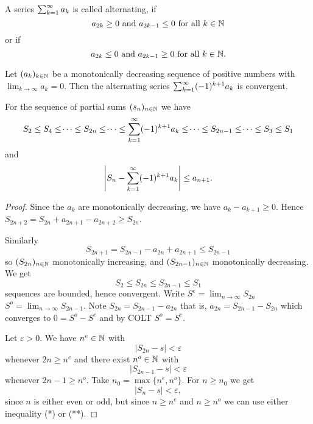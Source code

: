 \documentclass[10pt, a4paper]{article}
\newcommand{\dseq}[2][n]{(#2_#1)_{#1 \in \N}}
\begin{document}
\begin{definition}
    A series $\sum_{k = 1}^{\infty} a_k$ is called alternating,
    if
    \[
    a_{2k} \geq 0\text{ and } a_{2k - 1} \leq 0\text{ for all $k \in \mathbb{N}$}
    \]
    or if 
    \[
    a_{2k} \leq 0\text{ and } a_{2k - 1} \geq 0\text{ for all $k \in \mathbb{N}$}.
    \]
\end{definition}

\begin{theorem}
    Let $\dseq[k]{a}$ be a monotonically decreasing sequence of positive numbers with $\lim_{k \rightarrow \infty}a_k = 0$.
    Then the alternating series $\sum_{k = 1}^{\infty}(-1) ^ {k + 1}a_k$ is convergent.

    For the sequence of partial sums $\dseq{s}$ we have
    \[
    S_2 \leq S_4 \leq \dotsi \leq S_{2n} \leq \dotsi \leq \sum_{k = 1}^{\infty}(-1) ^ {k + 1}a_k \leq \dotsi \leq S_{2n - 1} \leq \dotsi \leq S_3 \leq S_1
    \]
    and
    \[
    \left|S_n - \sum_{k = 1}^{\infty}(-1) ^ {k + 1}a_k\right| \leq a_{n + 1}.
    \]
    \begin{proof}
        Since the $a_k$ are monotonically decreasing,
        we have $a_k - a_{k + 1} \geq 0$.
        Hence $S_{2n + 2} = S_{2n} + a_{2n + 1} - a_{2n + 2} \geq S_{2n}$.
        
        Similarly
        \[
        S_{2n + 1} = S_{2n - 1} - a_{2n} + a_{2n + 1} \leq S_{2n - 1}
        \]
        so $(S_{2n})_{n \in \mathbb{N}}$ monotonically increasing,
        and $(S_{2n - 1})_{n \in \mathbb{N}}$ monotonically decreasing.
        We get
        \[
        S_2 \leq S_{2n} \leq S_{2n - 1} \leq S_1
        \]
        sequences are bounded,
        hence convergent.
        Write $S ^ e = \lim_{n \rightarrow \infty}S_{2n}$
        $S ^ o = \lim_{n \rightarrow \infty}S_{2n - 1}$.
        Note $S_{2n} = S_{2n - 1} - a_{2n}$
        that is,
        $a_{2n} = S_{2n - 1} - S_{2n}$
        which converges to $0 = S ^ o - S ^ e$
        and by COLT
        $S ^ o = S ^ e$.

        Let $\varepsilon > 0$.
        We have $n ^ e \in \mathbb{N}$ with
        \begin{equation}\tag{*}
            |S_{2n} - s| < \varepsilon
        \end{equation}
        whenever $2n \geq n ^ e$ and there exist $n ^ o \in \mathbb{N}$ with
        \begin{equation}\tag{**}
            |S_{2n - 1} - s| < \varepsilon
        \end{equation}
        whenever $2n - 1 \geq n ^ o$.
        Take $n_0 = \max\{n ^ e, n ^ o\}$.
        For $n \geq n_0$ we get
        \[
        |S_n - s| < \varepsilon,
        \]
        since $n$ is either even or odd,
        but since $n \geq n ^ e$ and $n \geq n ^ o$ we can use either inequality (*) or (**).
    \end{proof}
\end{theorem}
\end{document}
